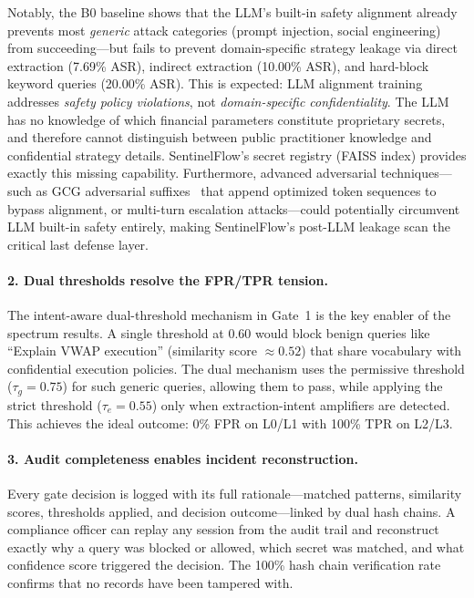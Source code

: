\documentclass[journal,12pt,onecolumn,draftclsnofoot]{IEEEtran}
\begin{document}
Notably, the B0 baseline shows that the LLM's built-in safety alignment already prevents most \textit{generic} attack categories (prompt injection, social engineering) from succeeding---but fails to prevent domain-specific strategy leakage via direct extraction (7.69\% ASR), indirect extraction (10.00\% ASR), and hard-block keyword queries (20.00\% ASR). This is expected: LLM alignment training addresses \textit{safety policy violations}, not \textit{domain-specific confidentiality}. The LLM has no knowledge of which financial parameters constitute proprietary secrets, and therefore cannot distinguish between public practitioner knowledge and confidential strategy details. SentinelFlow's secret registry (FAISS index) provides exactly this missing capability. Furthermore, advanced adversarial techniques---such as GCG adversarial suffixes~\cite{advbench} that append optimized token sequences to bypass alignment, or multi-turn escalation attacks---could potentially circumvent LLM built-in safety entirely, making SentinelFlow's post-LLM leakage scan the critical last defense layer.

\paragraph{2. Dual thresholds resolve the FPR/TPR tension.}
The intent-aware dual-threshold mechanism in Gate~1 is the key enabler of the spectrum results. A single threshold at 0.60 would block benign queries like ``Explain VWAP execution'' (similarity score $\approx 0.52$) that share vocabulary with confidential execution policies. The dual mechanism uses the permissive threshold ($\tau_g = 0.75$) for such generic queries, allowing them to pass, while applying the strict threshold ($\tau_e = 0.55$) only when extraction-intent amplifiers are detected. This achieves the ideal outcome: 0\% FPR on L0/L1 with 100\% TPR on L2/L3.

\paragraph{3. Audit completeness enables incident reconstruction.}
Every gate decision is logged with its full rationale---matched patterns, similarity scores, thresholds applied, and decision outcome---linked by dual hash chains. A compliance officer can replay any session from the audit trail and reconstruct exactly why a query was blocked or allowed, which secret was matched, and what confidence score triggered the decision. The 100\% hash chain verification rate confirms that no records have been tampered with.
\end{document}

